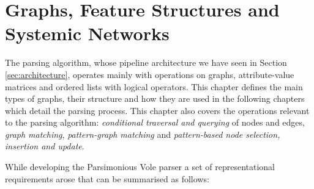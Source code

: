 \chapter{Graphs, Feature Structures and Systemic Networks}
\label{ch:data-structures}
    
    
    The parsing algorithm, whose pipeline architecture we have seen in Section \ref{sec:architecture}, operates mainly with operations on graphs, attribute-value matrices and ordered lists with logical operators. This chapter defines the main types of graphs, their structure and how they are used in the following chapters which detail the parsing process. This chapter also covers the operations relevant to the parsing algorithm: \textit{conditional traversal and querying} of nodes and edges, \textit{graph matching}, \textit{pattern-graph matching} and \textit{pattern-based node selection, insertion and update}.

    While developing the Parsimonious Vole parser a set of representational requirements arose that can be summarised as follows:


